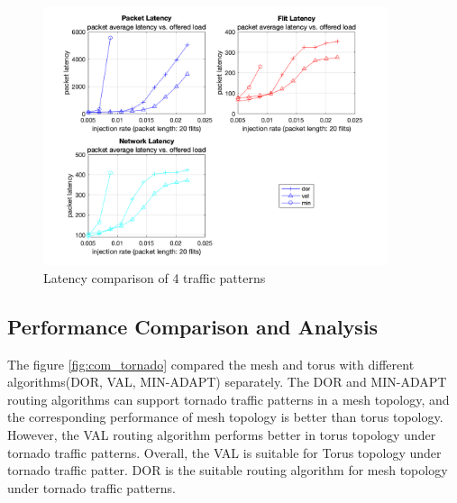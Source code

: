 \begin{figure}[H]
    \centering
    \includegraphics[width=0.9\textwidth]{Images/chap2/torus_tornado/torus_comparison.png}
    \caption{Latency comparison of 4 traffic patterns}
    \label{fig:com_torus_tornado}
\end{figure}



\subsection{Performance Comparison and Analysis}

The figure \ref{fig:com_tornado} compared the mesh and torus with different algorithms(DOR, VAL, MIN-ADAPT) separately. The DOR and MIN-ADAPT routing algorithms can support tornado traffic patterns in a mesh topology, and the corresponding performance of mesh topology is better than torus topology. However, the VAL routing algorithm performs better in torus topology under tornado traffic patterns. Overall, the VAL is suitable for Torus topology under tornado traffic patter. DOR is the suitable routing algorithm for mesh topology under tornado traffic patterns.

